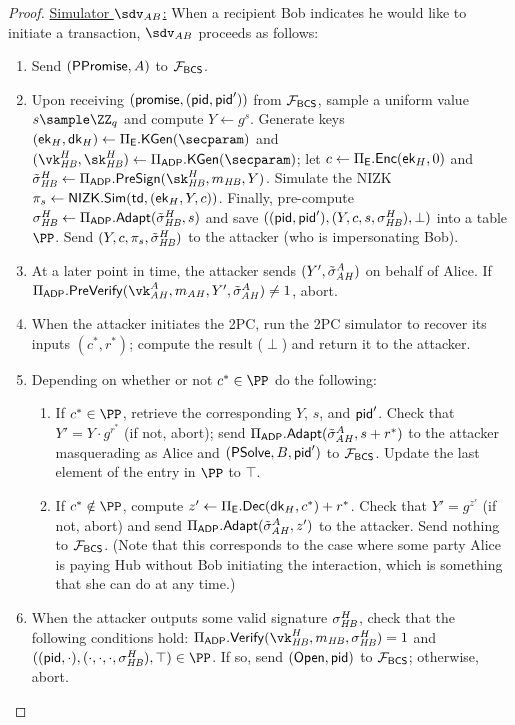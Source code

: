 \begin{proof}
\smallskip
\noindent\underline{Simulator $\Sim_{AB}$:} When a recipient Bob indicates he would like to initiate a transaction, $\Sim_{AB}$ proceeds as follows:
\begin{enumerate}
    \item Send $(\mathsf{PPromise}, A)$ to $\mathcal{F}_{\mathsf{BCS}}$.
    \item Upon receiving $(\mathsf{promise}, (\mathsf{pid},\mathsf{pid}'))$ from $\mathcal{F}_{\mathsf{BCS}}$, sample a uniform value $s \sample \ZZ_q$ and compute $Y \gets g^s$. Generate keys $(\ek_H,\dk_H) \gets \Pi_\ENC.\kgen(\secparam)$ and $(\vk_\hb^H, \sk_\hb^H) \gets \Pi_\ADP.\kgen(\secparam)$; let $c \gets \Pi_{\mathsf{E}}.{\mathsf{Enc}}(\mathsf{ek}_H, 0)$ and $\presig_\hb^H \gets \Pi_\ADP.\presign(\sk_\hb^H, m_\hb, Y)$. Simulate the NIZK $\pi_s \gets \mathsf{NIZK}.\mathsf{Sim}(\mathsf{td},\allowbreak (\mathsf{ek}_H, Y,c))$. Finally, pre-compute $\sigma_{\mathit{HB}}^H \gets \Pi_{\mathsf{ADP}}.\mathsf{Adapt}(\tilde{\sigma}_{\mathit{HB}}^H, s)$ and save $((\mathsf{pid},\mathsf{pid}'),(Y,c,s,\sigma_{\mathit{HB}}^H),\perp)$ into a table $\PP$. Send $(Y,c,\pi_s,\tilde{\sigma}_{\mathit{HB}}^H)$ to the attacker (who is impersonating Bob).
    \item At a later point in time, the attacker sends $(Y', \tilde{\sigma}_{\mathit{AH}}^A)$ on behalf of Alice. If $\Pi_\ADP.\prevrfy(\vk_\ah^A, m_\ah, Y', \presig_\ah^A) \neq 1$, abort.
    \item When the attacker initiates the 2PC, run the 2PC simulator to recover its inputs $(c^*, r^*)$; compute the result ($\perp$) and return it to the attacker.
    \item Depending on whether or not $c^* \in \PP$ do the following:
    \begin{enumerate}
        \item If $c^*\in\PP$, retrieve the corresponding $Y$, $s$, and $\mathsf{pid}'$. Check that $Y' = Y \cdot g^{r^*}$ (if not, abort); send $\Pi_{\mathsf{ADP}}.\mathsf{Adapt}(\tilde{\sigma}_{\mathit{AH}}^A, s+r^*)$ to the attacker masquerading as Alice and $(\mathsf{PSolve}, B, \mathsf{pid}')$ to $\mathcal{F}_{\mathsf{BCS}}$. Update the last element of the entry in $\PP$ to $\top$.
        \item If $c^* \notin \PP$, compute $z' \gets \Pi_{\mathsf{E}}.{\mathsf{Dec}}(\mathsf{dk}_H, c^*) + r^*$. Check that $Y' = g^{z'}$ (if not, abort) and send $\Pi_{\mathsf{ADP}}.\mathsf{Adapt}(\tilde{\sigma}_{\mathit{AH}}^A, z')$ to the attacker. Send nothing to $\mathcal{F}_{\mathsf{BCS}}$. (Note that this corresponds to the case where some party Alice is paying Hub without Bob initiating the interaction, which is something that she can do at any time.)
    \end{enumerate}
    \item When the attacker outputs some valid signature $\sigma_{\mathit{HB}}^H$, check that the following conditions hold: $\Pi_\ADP.\vrfy(\vk_\hb^H, m_\hb, \sigma_\hb^H)=1$ and $((\pid,\cdot),\allowbreak(\cdot, \cdot, \cdot, \sigma_\hb^H),\top) \in \PP$. If so, send $(\mathsf{Open}, \mathsf{pid})$ to $\mathcal{F}_{\mathsf{BCS}}$; otherwise, abort.
\end{enumerate}


\end{proof}
